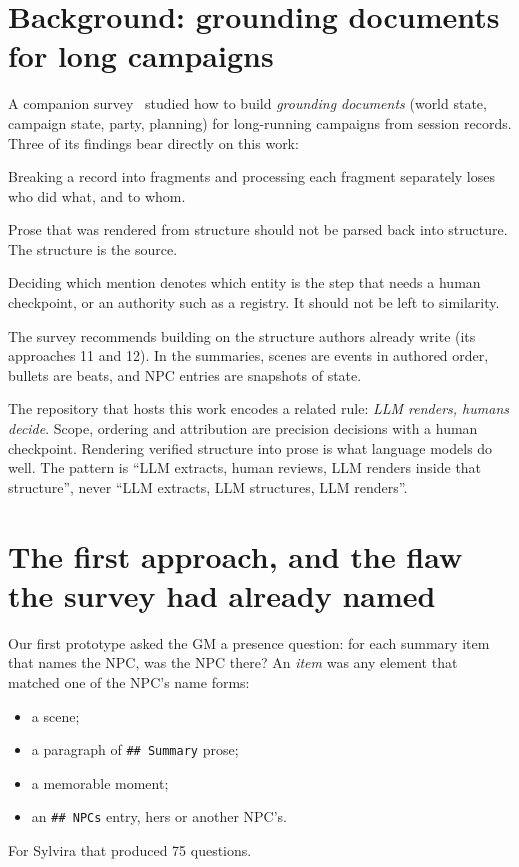 \documentclass[11pt]{article}
\newcommand{\code}[1]{\texttt{#1}}
\begin{document}
\section{Background: grounding documents for long campaigns}\label{sec:survey}

A companion survey~\citep{roussos2026grounding} studied how to build \emph{grounding
documents} (world state, campaign state, party, planning) for long-running campaigns
from session records. Three of its findings bear directly on this work:
\begin{description}[nosep,leftmargin=1.5em]
\item[Atomisation destroys attribution (F2).] Breaking a record into fragments and
processing each fragment separately loses who did what, and to whom.
\item[Do not undo a rendering step (F10).] Prose that was rendered from structure
should not be parsed back into structure. The structure is the source.
\item[Identity is the precision decision (F8).] Deciding which mention denotes which
entity is the step that needs a human checkpoint, or an authority such as a
registry. It should not be left to similarity.
\end{description}
The survey recommends building on the structure authors already write (its approaches
11 and 12). In the summaries, scenes are events in authored order, bullets are beats,
and NPC entries are snapshots of state.

The repository that hosts this work encodes a related rule: \emph{LLM renders, humans
decide}. Scope, ordering and attribution are precision decisions with a human
checkpoint. Rendering verified structure into prose is what language models do well.
The pattern is ``LLM extracts, human reviews, LLM renders inside that structure'',
never ``LLM extracts, LLM structures, LLM renders''.

\section{The first approach, and the flaw the survey had already named}\label{sec:flaw}

Our first prototype asked the GM a presence question: for each summary item that names
the NPC, was the NPC there? An \emph{item} was any element that matched one of the
NPC's name forms:
\begin{itemize}[nosep]
\item a scene;
\item a paragraph of \code{\#\# Summary} prose;
\item a memorable moment;
\item an \code{\#\# NPCs} entry, hers or another NPC's.
\end{itemize}
For Sylvira that produced 75 questions.
\end{document}
